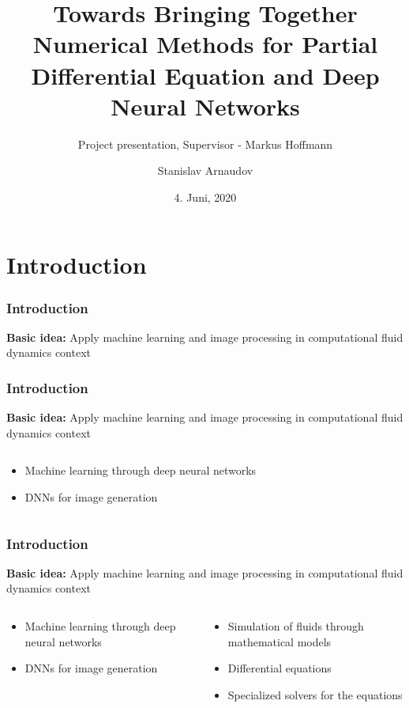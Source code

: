 \documentclass[18pt, xcolor=table]{beamer}
\title[Project discussion]{Towards Bringing Together Numerical Methods for Partial Differential Equation and Deep Neural Networks}
\subtitle{Project presentation, Supervisor - Markus Hoffmann}
\author{Stanislav Arnaudov}
\institute{Chair for Computer Architecture and Parallel Processing}
\date{4. Juni, 2020}
\begin{document}
\begin{frame}
 \titlepage
\end{frame}

\section{Introduction}


\begin{frame}[t]
  \frametitle{Introduction}
  \textbf{Basic idea:} Apply machine learning and image processing in computational fluid dynamics context
\end{frame}

\begin{frame}[t]
  \frametitle{Introduction}
  \textbf{Basic idea:} Apply machine learning and image processing in computational fluid dynamics context

  \begin{columns}[t]
    \begin{column}{0.5\textwidth}

      \begin{itemize}
      \item Machine learning through deep neural networks
      \item DNNs for image generation
      \end{itemize}

    \end{column}
    \begin{column}{0.5\textwidth}

    \end{column}
  \end{columns}
\end{frame}

\begin{frame}[t]
  \frametitle{Introduction}
  \textbf{Basic idea:} Apply machine learning and image processing in computational fluid dynamics context

  \begin{columns}[t]
    \begin{column}{0.5\textwidth}

      \begin{itemize}
      \item Machine learning through deep neural networks
      \item DNNs for image generation
      \end{itemize}

    \end{column}
    \begin{column}{0.5\textwidth}

      \begin{itemize}
      \item Simulation of fluids through mathematical models
      \item Differential equations
      \item Specialized solvers for the equations
      \end{itemize}

    \end{column}
  \end{columns}
\end{frame}
\end{document}
